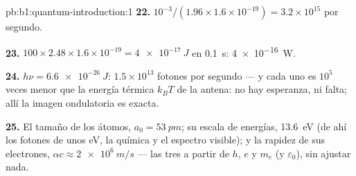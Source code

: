 \begin{solution}{pb:b1:quantum-introduction:1}
\textbf{22.} $10^{-3}/(1.96 \times 1.6 \times 10^{-19}) = 3.2 \times 10^{15}$ por segundo.

\textbf{23.} $100 \times 2.48 \times 1.6 \times 10^{-19} = \qty{4e-17}{J}$ en \qty{0.1}{s}:
\qty{4e-16}{W}.

\textbf{24.} $h\nu = \qty{6.6e-26}{J}$: $1.5 \times 10^{13}$ fotones por segundo ---
y cada uno es $10^5$ veces menor que la energía térmica $k_BT$ de la
antena: no hay esperanza, ni falta; allí la imagen ondulatoria es exacta.

\textbf{25.} El tamaño de los átomos, $a_0 = \qty{53}{pm}$; su escala de
energías, \qty{13.6}{eV} (de ahí los fotones de unos eV, la química y el
espectro visible); y la rapidez de sus electrones, $\alpha c \approx \qty{2e6}{m/s}$ --- las tres
a partir de $h$, $e$ y $m_e$ (y $\varepsilon_0$), sin ajustar nada.
\end{solution}

